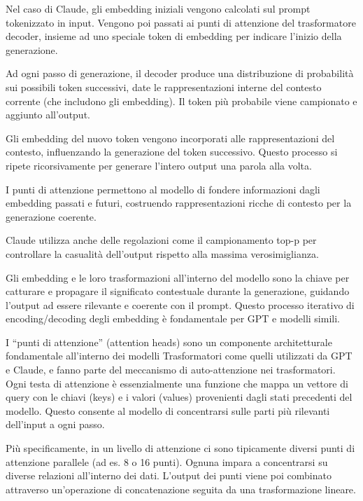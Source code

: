             Nel caso di Claude, gli embedding iniziali vengono calcolati sul prompt tokenizzato in input. Vengono poi passati ai punti di attenzione del trasformatore decoder, insieme ad uno speciale token di embedding per indicare l'inizio della generazione.
            
            Ad ogni passo di generazione, il decoder produce una distribuzione di probabilità sui possibili token successivi, date le rappresentazioni interne del contesto corrente (che includono gli embedding). Il token più probabile viene campionato e aggiunto all'output.
            
            Gli embedding del nuovo token vengono incorporati alle rappresentazioni del contesto, influenzando la generazione del token successivo. Questo processo si ripete ricorsivamente per generare l'intero output una parola alla volta.
            
            I punti di attenzione permettono al modello di fondere informazioni dagli embedding passati e futuri, costruendo rappresentazioni ricche di contesto per la generazione coerente.
            
            Claude utilizza anche delle regolazioni come il campionamento top-p per controllare la casualità dell'output rispetto alla massima verosimiglianza.
            
            Gli embedding e le loro trasformazioni all'interno del modello sono la chiave per catturare e propagare il significato contestuale durante la generazione, guidando l'output ad essere rilevante e coerente con il prompt. Questo processo iterativo di encoding/decoding degli embedding è fondamentale per GPT e modelli simili.
            
             I ``punti di attenzione'' (attention heads) sono un componente architetturale fondamentale all'interno dei modelli Trasformatori come quelli utilizzati da GPT e Claude, e fanno parte del meccanismo di auto-attenzione nei trasformatori. Ogni testa di attenzione è essenzialmente una funzione che mappa un vettore di query con le chiavi (keys) e i valori (values) provenienti dagli stati precedenti del modello. Questo consente al modello di concentrarsi sulle parti più rilevanti dell'input a ogni passo.
            
            Più specificamente, in un livello di attenzione ci sono tipicamente diversi punti di attenzione parallele (ad es. 8 o 16 punti). Ognuna impara a concentrarsi su diverse relazioni all'interno dei dati. L'output dei punti viene poi combinato attraverso un'operazione di concatenazione seguita da una trasformazione lineare.
            
